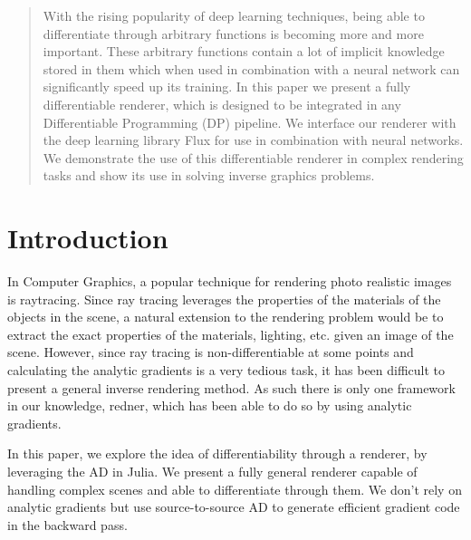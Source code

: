 \documentclass{juliacon}
\begin{document}


\maketitle

\begin{abstract}
With the rising popularity of deep learning techniques, being able to differentiate through arbitrary functions is becoming more and more important. These arbitrary functions contain a lot of implicit knowledge stored in them which when used in combination with a neural network can significantly speed up its training. In this paper we present a fully differentiable renderer, which is designed to be integrated in any Differentiable Programming (DP) pipeline. We interface our renderer with the deep learning library Flux for use in combination with neural networks. We demonstrate the use of this differentiable renderer in complex rendering tasks and show its use in solving inverse graphics problems. 


\headingtable

\end{abstract}


\section{Introduction}
\label{intro}

In Computer Graphics, a popular technique for rendering photo realistic images is raytracing. Since ray tracing leverages the properties of the materials of the objects in the scene, a natural extension to the rendering problem would be to extract the exact properties of the materials, lighting, etc. given an image of the scene. However, since ray tracing is non-differentiable at some points and calculating the analytic gradients is a very tedious task, it has been difficult to present a general inverse rendering method. As such there is only one framework in our knowledge, redner\cite{Li:2018:DMC}, which has been able to do so by using analytic gradients.

In this paper, we explore the idea of differentiability through a renderer, by leveraging the AD in Julia\cite{bezanson2017julia}. We present a fully general renderer capable of handling complex scenes and able to differentiate through them. We don't rely on analytic gradients but use source-to-source AD to generate efficient gradient code in the backward pass.
\end{document}
